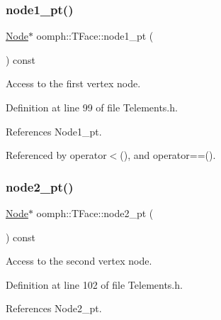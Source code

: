 \mbox{\label{classoomph_1_1TFace_a9beeb47006fee3e8f0ee1abe0113c77d}} 
\subsubsection{\texorpdfstring{node1\+\_\+pt()}{node1\_pt()}}
{\footnotesize\ttfamily \hyperlink{classoomph_1_1Node}{Node}$\ast$ oomph\+::\+T\+Face\+::node1\+\_\+pt (\begin{DoxyParamCaption}{ }\end{DoxyParamCaption}) const\hspace{0.3cm}{\ttfamily [inline]}}



Access to the first vertex node. 



Definition at line 99 of file Telements.\+h.



References Node1\+\_\+pt.



Referenced by operator$<$(), and operator==().

\mbox{\label{classoomph_1_1TFace_a460a1e071534f0044b11e4143ccd0213}} 
\subsubsection{\texorpdfstring{node2\+\_\+pt()}{node2\_pt()}}
{\footnotesize\ttfamily \hyperlink{classoomph_1_1Node}{Node}$\ast$ oomph\+::\+T\+Face\+::node2\+\_\+pt (\begin{DoxyParamCaption}{ }\end{DoxyParamCaption}) const\hspace{0.3cm}{\ttfamily [inline]}}



Access to the second vertex node. 



Definition at line 102 of file Telements.\+h.



References Node2\+\_\+pt.



